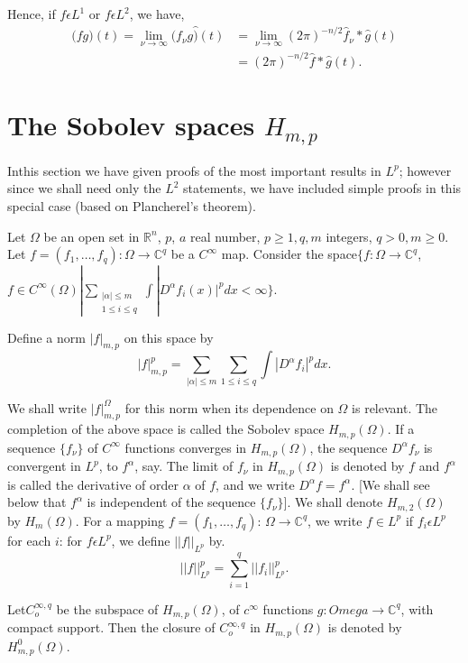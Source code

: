 Hence, if $f  \epsilon L^1 $  or $ f  \epsilon L^2$, we have,
\begin{align*}
  (fg\hat{)} (t) = \lim_{\nu \to \infty} (f_{\nu} g\hat{)}(t) & =
  \lim_{\nu \to \infty} (2 \pi)^{-n/2} \hat{f}_{\nu} * \hat{g}(t)\\ 
  & = (2 \pi)^{-n/2} \hat{f}  *  \hat{g}(t). 
\end{align*} 

\section{The Sobolev spaces $H_{m, p}$}\label{chap3:sec5}%

In\pageoriginale this section we have given proofs of the most important results in
$L^{p}$; however since we shall need only the $L^{2}$ statements, we
have included simple proofs in this special case (based on
Plancherel's theorem). 

Let $\Omega$ be an open set in $\mathbb{R}^{n}$, $p$, $a$ real number,
$p \ge 1, q,m$ integers, $q > 0, m \geq 0 $. Let  $f = (f_1, \ldots
,f_q) : \Omega \to \mathbb{C}^{q}$ be a $C^{\infty}$ map. Consider
the space$  \{f: \Omega \to \mathbb{C}^{q}$, $f \in C^{\infty}(\Omega)
| \sum\limits_{\substack{|\alpha | \le m \\ 1 \le i \le q}}\int |
D^\alpha f _i(x)|^p dx < \infty \}$. 

Define a norm $|f|_{m,p}$ on this space by
$$
|f|^p_{m, p} = \sum_{|\alpha| \leq m} \sum_{1 \leq i \leq q} \int
|D^{\alpha} f_i|^p dx. 
$$

We shall write $|f|^{\Omega}_{m,p}$ for this norm when its dependence
on $\Omega$ is relevant. The completion of the above space is called
the Sobolev space $H_{m,p}(\Omega)$. If a sequence $\{ f_{\nu}\}$ of
$C^{\infty}$ functions converges in $H_{m,p}(\Omega)$, the sequence
$D^{\alpha} f_{\nu}$ is convergent in $L^p$, to $f^{\alpha}$, say. The
limit of $f_{\nu}$ in  $H_{m,p}(\Omega)$ is denoted by $f$ and
$f^{\alpha}$ is called the derivative of order $\alpha$ of $f$, and we
write $D^{\alpha}f = f^{\alpha}$. [We shall see below that $ f
  ^{\alpha} $ is independent of the sequence $\{f_\nu\}]$. We shall
denote $H_{m,2}(\Omega)$ by $H_m(\Omega)$. For a mapping $f =
(f_1,\ldots, f_q)$: $\Omega \to \mathbb{C}^q$, we write $f \in L^{p}$
if $f_i \epsilon L^{p}$ for each $i$: for $f \epsilon L^{p}$, we
define $||f|| _{L^{p}}$ by. 
$$
|| f || ^{p}_{L^{p}} = \sum_{i=1}^{q}  || f_i ||^{p}_{L^{p}}.
$$

Let\pageoriginale $C_{o}^{\infty,q}$ be the subspace of $H_{m,p}(\Omega)$, of
$c^{\infty}$ functions $g:Omega \to \mathbb{C} ^{q}$, with compact
support. Then the closure of $C_{o}^{\infty,q}$ in $H_{m,p}(\Omega)$
is denoted by $H^0_{m,p}(\Omega)$. 

